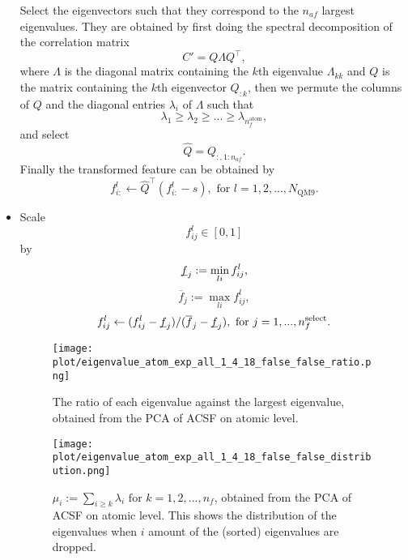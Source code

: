 \documentclass[12pt]{article}
\begin{document}
\begin{itemize}
	Select the eigenvectors such that they correspond to the $n_{af}$ largest eigenvalues. They are obtained by first doing the spectral decomposition of the correlation matrix
	\begin{equation}
		C' = Q\Lambda Q^\top,
	\end{equation}
	where $\Lambda$ is the diagonal matrix containing the $k$th eigenvalue $\Lambda_{kk}$ and $Q$ is the matrix containing the $k$th eigenvector $Q_{:k}$, then we permute the columns of $Q$ and the diagonal entries $\lambda_i$ of $\Lambda$ such that
	\begin{equation}
		\lambda_{1} \geq \lambda_{2} \geq  ... \geq \lambda_{n^\text{atom}_f},
	\end{equation}
	and select
	\begin{equation}
		\hat{Q} = Q_{:, 1:n_{af}}.
	\end{equation}
	Finally the transformed feature can be obtained by
	\begin{equation}
		\label{eq:pca_atom_end}
		f^l_{i:} \leftarrow \hat{Q}^\top(f^l_{i:} - s), \text{ for }l = 1,2,...,N_\text{QM9}.
	\end{equation}
	\item Scale
	\begin{equation}
		\label{eq:scale_1}
		f^l_{ij} \in [0, 1]
	\end{equation}
	by
	\begin{equation}
		\underbar{$f$}_j := \min_{li} f^l_{ij},
	\end{equation}
	\begin{equation}
		\overline{f}_j := \max_{li} f^l_{ij},
	\end{equation}
	\begin{equation}
		f^l_{ij} \leftarrow (f^l_{ij} - \underbar{$f$}_j)/ (\overline{f}_j - \underbar{$f$}_j), \text{ for } j = 1,..., n_f^\text{select}.
	\end{equation}
	\begin{figure}[h]
		\label{fig:PCA_atom_rat}
		\centering
		\texttt{[image: plot/eigenvalue\_atom\_exp\_all\_1\_4\_18\_false\_false\_ratio.png]}
		\caption{The ratio of each eigenvalue against the largest eigenvalue, obtained from the PCA of ACSF on atomic level.}
	\end{figure}
	\begin{figure}[H]
		\label{fig:PCA_atom_dist}
		\centering
		\texttt{[image: plot/eigenvalue\_atom\_exp\_all\_1\_4\_18\_false\_false\_distribution.png]}
		\caption{$\mu_i := \sum_{i\geq k} \lambda_i \text{ for } k = 1,2,...,n_f$, obtained from the PCA of ACSF on atomic level. This shows the distribution of the eigenvalues when $i$ amount of the (sorted) eigenvalues are dropped.}
	\end{figure}
\end{itemize}
\end{document}
